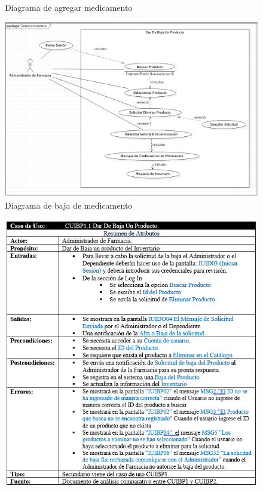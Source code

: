 \documentclass[12pt,letterpaper]{article}
\begin{document}
{\begin{figure}[!htb]
            \caption{Diagrama de agregar medicamento}
        \end{figure}
        \begin{figure}[!htb]
            \centering
            \includegraphics [scale=0.5]{bajaProducto}
            \caption{Diagrama de baja de medicamento}
        \end{figure}
        \begin{figure}[!htb]
            \centering
            \includegraphics [scale=0.9]{especificacionBajaProducto}

\end{figure}}
\end{document}
